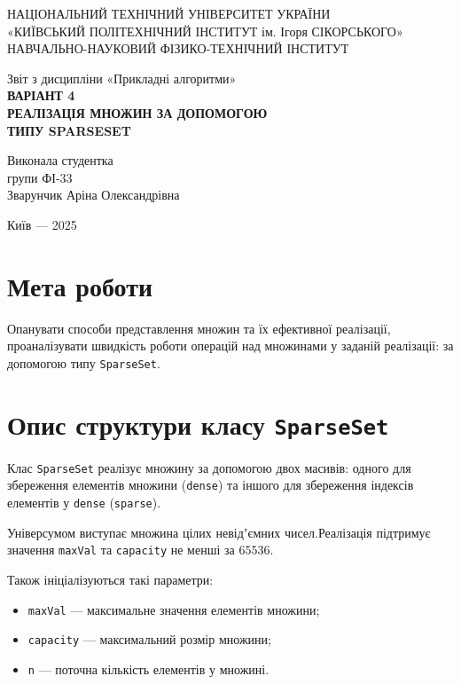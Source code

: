 \documentclass[12pt,a4paper]{article}
\begin{document}
\begin{titlepage}
    \centering
    \normalsize
    НАЦІОНАЛЬНИЙ ТЕХНІЧНИЙ УНІВЕРСИТЕТ УКРАЇНИ\\
    «КИЇВСЬКИЙ ПОЛІТЕХНІЧНИЙ ІНСТИТУТ ім. Ігоря СІКОРСЬКОГО»\\
    НАВЧАЛЬНО-НАУКОВИЙ ФІЗИКО-ТЕХНІЧНИЙ ІНСТИТУТ
    
    \vfill
    
    \LARGE Звіт з дисципліни «Прикладні алгоритми»\\[2em]
    \Large\textbf{ВАРІАНТ 4}\\[1em]
    \LARGE\textbf{РЕАЛІЗАЦІЯ МНОЖИН ЗА ДОПОМОГОЮ}\\[0.4em]
    \LARGE\textbf{ТИПУ SPARSESET}
    
    \vfill
    
    \begin{flushright}
        \large
        Виконала студентка\\
        групи ФІ-33\\
        Зварунчик Аріна Олександрівна
    \end{flushright}
    
    \vspace{3em}
    Київ — 2025
\end{titlepage}

\tableofcontents 
\newpage

\section{Мета роботи}
Опанувати способи представлення множин та їх ефективної реалізації, 
проаналізувати швидкість роботи операцій над множинами у заданій реалізації: 
за допомогою типу \texttt{SparseSet}.

\section{Опис структури класу \texttt{SparseSet}}
Клас \texttt{SparseSet} реалізує множину за допомогою двох масивів:
одного для збереження елементів множини (\texttt{dense})
та іншого для збереження індексів елементів у \texttt{dense} (\texttt{sparse}).

Універсумом виступає множина цілих невідʼємних чисел.Реалізація підтримує значення \texttt{maxVal} та \texttt{capacity} не менші за $65536$.

Також ініціалізуються такі параметри:
\begin{itemize}
    \item \texttt{maxVal} --- максимальне значення елементів множини;
    \item \texttt{capacity} --- максимальний розмір множини;
    \item \texttt{n} --- поточна кількість елементів у множині.
\end{itemize}
\end{document}

